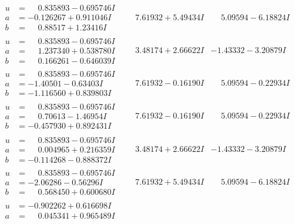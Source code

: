 \documentclass[1p]{elsarticle_modified}
\theoremstyle{definition}
\begin{document}
$$\begin{array}{c|c|c}
\begin{aligned}
u &= \phantom{-}0.835893 - 0.695746 I \\
a &= -0.126267 + 0.911046 I \\
b &= \phantom{-}0.88517 + 1.23416 I\end{aligned}
 & \phantom{-}7.61932 + 5.49434 I & \phantom{-}5.09594 - 6.18824 I \\ \hline\begin{aligned}
u &= \phantom{-}0.835893 - 0.695746 I \\
a &= \phantom{-}1.237340 + 0.538780 I \\
b &= \phantom{-}0.166261 - 0.646039 I\end{aligned}
 & \phantom{-}3.48174 + 2.66622 I & -1.43332 - 3.20879 I \\ \hline\begin{aligned}
u &= \phantom{-}0.835893 - 0.695746 I \\
a &= -1.40501 - 0.63403 I \\
b &= -1.116560 + 0.839803 I\end{aligned}
 & \phantom{-}7.61932 - 0.16190 I & \phantom{-}5.09594 - 0.22934 I \\ \hline\begin{aligned}
u &= \phantom{-}0.835893 - 0.695746 I \\
a &= \phantom{-}0.70613 - 1.46954 I \\
b &= -0.457930 + 0.892431 I\end{aligned}
 & \phantom{-}7.61932 - 0.16190 I & \phantom{-}5.09594 - 0.22934 I \\ \hline\begin{aligned}
u &= \phantom{-}0.835893 - 0.695746 I \\
a &= \phantom{-}0.004965 + 0.216359 I \\
b &= -0.114268 - 0.888372 I\end{aligned}
 & \phantom{-}3.48174 + 2.66622 I & -1.43332 - 3.20879 I \\ \hline\begin{aligned}
u &= \phantom{-}0.835893 - 0.695746 I \\
a &= -2.06286 - 0.56296 I \\
b &= \phantom{-}0.568450 + 0.600680 I\end{aligned}
 & \phantom{-}7.61932 + 5.49434 I & \phantom{-}5.09594 - 6.18824 I \\ \hline\begin{aligned}
u &= -0.902262 + 0.616698 I \\
a &= \phantom{-}0.045341 + 0.965489 I \\

\end{aligned}
\end{array}$$
\end{document}
